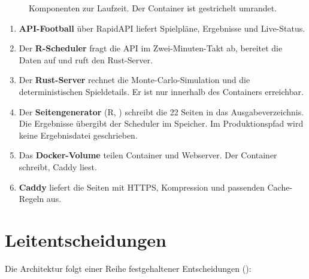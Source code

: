 \begin{figure}[ht]
{}
\caption{Komponenten zur Laufzeit. Der Container ist gestrichelt umrandet.}
\label{fig:architektur}
\end{figure}

\begin{enumerate}
  \item \textbf{API-Football} über RapidAPI liefert Spielpläne, Ergebnisse
        und Live-Status.
  \item Der \textbf{R-Scheduler} fragt die API im Zwei-Minuten-Takt ab,
        bereitet die Daten auf und ruft den Rust-Server.
  \item Der \textbf{Rust-Server} rechnet die Monte-Carlo-Simulation und die
        deterministischen Spieldetails. Er ist nur innerhalb des Containers
        erreichbar.
  \item Der \textbf{Seitengenerator} (R, ) schreibt die 22
        Seiten in das Ausgabeverzeichnis. Die Ergebnisse übergibt der
        Scheduler im Speicher. Im Produktionspfad wird keine Ergebnisdatei
        geschrieben.
  \item Das \textbf{Docker-Volume}  teilen Container und
        Webserver. Der Container schreibt, Caddy liest.
  \item \textbf{Caddy} liefert die Seiten mit HTTPS, Kompression und
        passenden Cache-Regeln aus.
\end{enumerate}

\section{Leitentscheidungen}

Die Architektur folgt einer Reihe festgehaltener Entscheidungen
():

